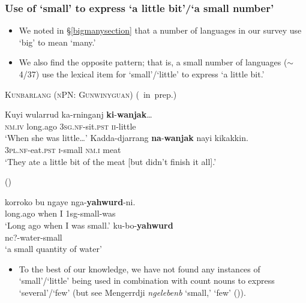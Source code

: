 \documentclass{article}
\begin{document}
\subsubsection{Use of `small' to express `a little bit'/`a small number'}
\begin{itemize}
\item We noted in \S\ref{bigmanysection} that a number of languages in our survey use `big' to mean `many.'
\item We also find the opposite pattern; that is, a small number of languages ($\sim$4/37) use the lexical item for `small'/`little' to express `a little bit.'
\end{itemize}
\begin{exe}
  \ex\label{ex:lil} \textsc{Kunbarlang (nPN: Gunwinyguan)} (\citealt{ikthesis}~in~prep.)
  \begin{xlist}
    \ex \gll Kuyi wularrud ka-rninganj \textbf{ki}-\textbf{wanjak}\ldots\\
    \textsc{nm.iv} long.ago \textsc{3sg.nf}-sit.\textsc{pst} \textsc{ii}-little\\
    \glt `When she was little\ldots' %
    \ex \gll Kadda-djarrang \textbf{na}-\textbf{wanjak} nayi kikakkin.\\
    \textsc{3pl.nf}-eat.\textsc{pst} \textsc{i}-small \textsc{nm.i} meat\\
    \glt `They ate a little bit of the meat [but didn't finish it all].' %
  \end{xlist}
   (\citealt[76,116]{carroll76})
  \begin{xlist}
    \ex 
    \gll korroko     bu    ngaye        nga-\textbf{yahwurd}-ni. \\
    long.ago    when    I        1{\sc sg}-small-was \\
    \glt    `Long ago when I was small.'
    \ex \gll ku-bo-\textbf{yahwurd} \\
    {\sc nc?}-water-small\\
    \glt `a small quantity of water' 
  \end{xlist}
\end{exe}

\begin{itemize}
\item To the best of our knowledge, we have not found any instances of `small'/`little' being used in combination with count nouns to express `several'/`few' (but see Mengerrdji \textit{ngelebenb} `small,' `few' (\citealt[70]{birch06})).
\end{itemize}    
\end{document}
